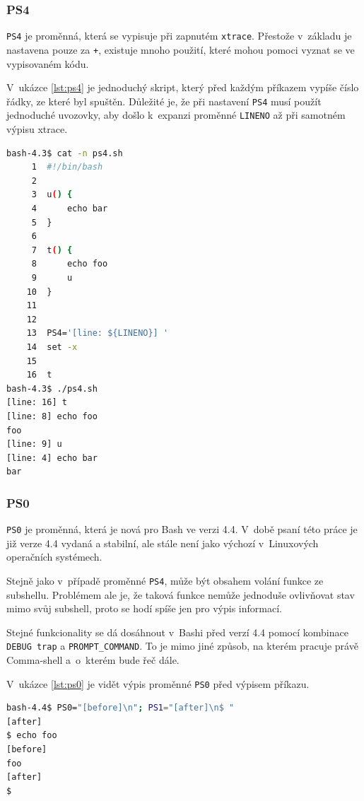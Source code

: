 \documentclass[thesis=M,czech]{FITthesis}[2012/06/26]
\begin{document}
%
%
%
\subsubsection{PS4}
\texttt{PS4} je proměnná, která se vypisuje při zapnutém \texttt{xtrace}. Přestože v~základu je nastavena pouze za \texttt{+}, existuje mnoho použití, které mohou pomoci vyznat se ve vypisovaném kódu.

V~ukázce \ref{lst:ps4} je jednoduchý skript, který před každým příkazem vypíše číslo řádky, ze které byl spuštěn. Důležité je, že při nastavení \texttt{PS4} musí použít jednoduché uvozovky, aby došlo k~expanzi proměnné \texttt{LINENO} až při samotném výpisu xtrace.

\noindent
\begin{minipage}{\linewidth}
\begin{lstlisting}[language=bash, caption={\texttt{PS4}}, label={lst:ps4}]
bash-4.3$ cat -n ps4.sh
     1	#!/bin/bash
     2
     3	u() {
     4		echo bar
     5	}
     6
     7	t() {
     8		echo foo
     9		u
    10	}
    11
    12
    13	PS4='[line: ${LINENO}] '
    14	set -x
    15
    16	t
bash-4.3$ ./ps4.sh
[line: 16] t
[line: 8] echo foo
foo
[line: 9] u
[line: 4] echo bar
bar
\end{lstlisting}
\end{minipage}

%
%
%
\subsubsection{PS0}

\texttt{PS0} je proměnná, která je nová pro Bash ve verzi 4.4. V~době psaní této práce je již verze 4.4 vydaná a stabilní, ale stále není jako výchozí v~Linuxových operačních systémech.

Stejně jako v~případě proměnné \texttt{PS4}, může být obsahem volání funkce ze subshellu. Problémem ale je, že taková funkce nemůže jednoduše ovlivňovat stav mimo svůj subshell, proto se hodí spíše jen pro výpis informací.

Stejné funkcionality se dá dosáhnout v~Bashi před verzí 4.4 pomocí kombinace \texttt{DEBUG trap} a \texttt{PROMPT\_COMMAND}. To je mimo jiné způsob, na kterém pracuje právě Comma-shell a~o~kterém bude řeč dále.

V~ukázce \ref{lst:ps0} je vidět výpis proměnné \texttt{PS0} před výpisem příkazu.

\noindent
\begin{minipage}{\linewidth}
\begin{lstlisting}[language=bash, caption={\texttt{PS0}}, label={lst:ps0}]
bash-4.4$ PS0="[before]\n"; PS1="[after]\n$ "
[after]
$ echo foo
[before]
foo
[after]
$
\end{lstlisting}
\end{minipage}
\end{document}
